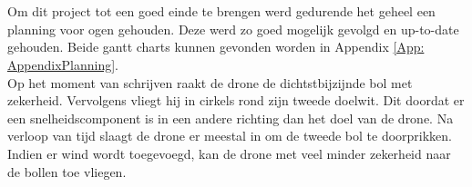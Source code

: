 \\
\\
Om dit project tot een goed einde te brengen werd gedurende het geheel een planning voor ogen gehouden. Deze werd zo goed mogelijk gevolgd en up-to-date gehouden. Beide gantt charts kunnen gevonden worden in Appendix \ref{App: AppendixPlanning}.
\\
Op het moment van schrijven raakt de drone de dichtstbijzijnde bol met zekerheid. Vervolgens vliegt hij in cirkels rond zijn tweede doelwit. Dit doordat er een snelheidscomponent is in een andere richting dan het doel van de drone. Na verloop van tijd slaagt de drone er meestal in om de tweede bol te doorprikken. Indien er wind wordt toegevoegd, kan de drone met veel minder zekerheid naar de bollen toe vliegen. 
